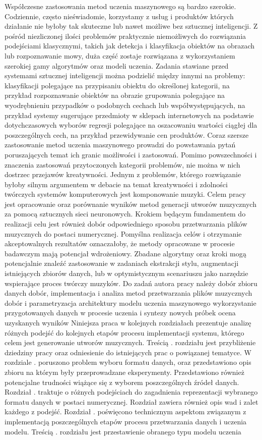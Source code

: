 Współczesne zastosowania metod uczenia maszynowego są bardzo szerokie. Codziennie, często nieświadomie, korzystamy z usług i produktów których działanie nie byłoby tak skuteczne lub nawet możliwe bez sztucznej inteligencji. Z pośród niezliczonej ilości problemów praktycznie niemożliwych do rozwiązania podejściami klasycznymi,  takich jak detekcja i klasyfikacja obiektów na obrazach lub rozpoznawanie mowy, duża część zostaje rozwiązana z wykorzystaniem szerokiej gamy algorytmów oraz modeli uczenia. Zadania stawiane przed systemami sztucznej inteligencji można podzielić między innymi na problemy:  klasyfikacji  polegające na przypisaniu obiektu do określonej kategorii,  na przykład rozpoznawanie obiektów na obrazie   grupowania  polegające na wyodrębnieniu przypadków o podobnych cechach  lub współwystępujących, na przykład systemy sugerujące przedmioty w sklepach internetowych na podstawie dotychczasowych wyborów  regresji  polegające na oszacowaniu wartości ciągłej dla poszczególnych cech,  na przykład przewidywanie cen produktów. Coraz szersze zastosowanie metod uczenia maszynowego prowadzi do powstawania pytań poruszających temat  ich granic możliwości i zastosowań. Pomimo powszechności i znaczenia zastosowań przytoczonych kategorii problemów, nie można w nich dostrzec przejawów kreatywności. Jednym z problemów, którego rozwiązanie byłoby silnym argumentem w debacie na temat kreatywności i zdolności twórczych systemów komputerowych jest komponowanie muzyki. Celem pracy jest opracowanie oraz porównanie wyników metod generacji utworów muzycznych za pomocą sztucznych sieci neuronowych. Krokiem będącym fundamentem do realizacji celu jest również dobór odpowiedniego sposobu przetwarzania plików muzycznych do postaci numerycznej. Pomyślna realizacja celów i otrzymanie akceptowalnych rezultatów oznaczałoby, że metody opracowane w procesie badawczym mają potencjał wdrożeniowy.  Zbadane algorytmy oraz kroki mogą potencjalnie znaleźć zastosowanie w zadaniach ekstrakcji stylu, augmentacji istniejących zbiorów danych, lub w optymistycznym scenariuszu jako narzędzie wspierające proces twórczy muzyków. Do zadań autora pracy należy  dobór zbioru danych  dobór, implementacja i analiza metod przetwarzania plików muzycznych  dobór i parametryzacja architektury modelu uczenia maszynowego  wykorzystanie przygotowanych danych  w procesie uczenia i syntezy nowych próbek  ocena uzyskanych wyników Niniejsza praca w kolejnych rozdziałach prezentuje analizę różnych podejść do kolejnych etapów procesu implementacji systemu, którego celem jest generowanie utworów muzycznych.  Treścią . rozdziału jest przybliżenie dziedziny pracy oraz odniesienie do istniejących prac o powiązanej tematyce. W rozdziale . poruszono problem wyboru formatu danych, oraz przedstawiono opis zbioru na którym były przeprowadzane eksperymenty. Przedstawiono również potencjalne trudności wiążące się z wyborem poszczególnych źródeł danych. Rozdział . traktuje o różnych podejściach do zagadnienia reprezentacji wybranego formatu  danych w postaci numerycznej. Rozdział zawiera również opis wad i zalet każdego z podejść. Rozdział . poświęcono technicznym aspektom związanym z implementacją poszczególnych etapów procesu  przetwarzania danych i uczenia modelu. Treścią . rozdziału jest przestawienie obranego typu modelu uczenia 